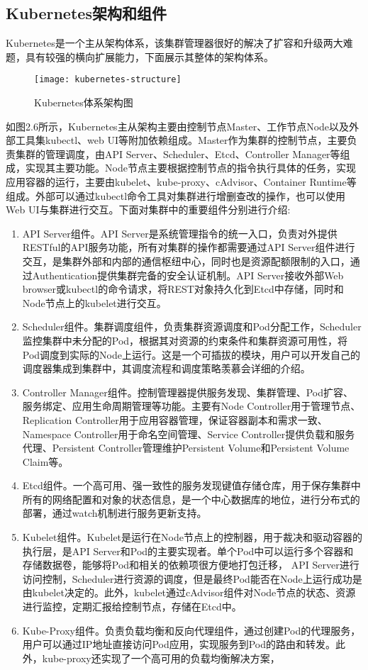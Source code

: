\subsection{Kubernetes架构和组件}
Kubernetes是一个主从架构体系，该集群管理器很好的解决了扩容和升级两大难题，具有较强的横向扩展能力，下面展示其整体的架构体系。
\begin{figure}[H] %
	\centering
	\texttt{[image: kubernetes-structure]}
	\caption{Kubernetes体系架构图}
	\label{fig:xfig1}
\end{figure}
如图2.6所示，Kubernetes主从架构主要由控制节点Master、工作节点Node以及外部工具集kubectl、web UI等附加依赖组成。Master作为集群的控制节点，主要负责集群的管理调度，由API Server、Scheduler、Etcd、Controller Manager等组成，实现其主要功能。Node节点主要根据控制节点的指令执行具体的任务，实现应用容器的运行，主要由kubelet、kube-proxy、cAdvisor、Container Runtime等组成。外部可以通过kubectl命令工具对集群进行增删查改的操作，也可以使用Web UI与集群进行交互。下面对集群中的重要组件分别进行介绍:
\begin{enumerate}[1.]
	\item  API Server组件。API Server是系统管理指令的统一入口，负责对外提供RESTful的API服务功能，所有对集群的操作都需要通过API Server组件进行交互，是集群外部和内部的通信枢纽中心，同时也是资源配额限制的入口，通过Authentication提供集群完备的安全认证机制。API Server接收外部Web browser或kubectl的命令请求，将REST对象持久化到Etcd中存储，同时和Node节点上的kubelet进行交互。
	\item Scheduler组件。集群调度组件，负责集群资源调度和Pod分配工作，Scheduler监控集群中未分配的Pod，根据其对资源的约束条件和集群资源可用性，将Pod调度到实际的Node上运行。这是一个可插拔的模块，用户可以开发自己的调度器集成到集群中，其调度流程和调度策略羡慕会详细的介绍。
	\item Controller Manager组件。控制管理器提供服务发现、集群管理、Pod扩容、服务绑定、应用生命周期管理等功能。主要有Node Controller用于管理节点、Replication Controller用于应用容器管理，保证容器副本和需求一致、Namespace Controller用于命名空间管理、Service Controller提供负载和服务代理、Persistent Controller管理维护Persistent Volume和Persistent Volume Claim等。
	\item Etcd组件。一个高可用、强一致性的服务发现键值存储仓库，用于保存集群中所有的网络配置和对象的状态信息，是一个中心数据库的地位，进行分布式的部署，通过watch机制进行服务更新支持。
	\item Kubelet组件。Kubelet是运行在Node节点上的控制器，用于裁决和驱动容器的执行层，是API Server和Pod的主要实现者。单个Pod中可以运行多个容器和存储数据卷，能够将Pod和相关的依赖项很方便地打包迁移，	API Server进行访问控制，Scheduler进行资源的调度，但是最终Pod能否在Node上运行成功是由kubelet决定的。此外，kubelet通过cAdvisor组件对Node节点的状态、资源进行监控，定期汇报给控制节点，存储在Etcd中。
	\item Kube-Proxy组件。负责负载均衡和反向代理组件，通过创建Pod的代理服务，用户可以通过IP地址直接访问Pod应用，实现服务到Pod的路由和转发。此外，kube-proxy还实现了一个高可用的负载均衡解决方案，
\end{enumerate}

